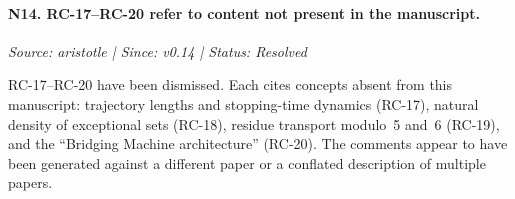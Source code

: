 \documentclass[12pt]{article}
\theoremstyle{definition}
\theoremstyle{remark}
\theoremstyle{plain}
\begin{document}
\paragraph{N14. RC-17--RC-20 refer to content not present in the manuscript.}
\textit{Source: aristotle | Since: v0.14 | Status: Resolved}

RC-17--RC-20 have been dismissed.  Each cites concepts absent from this
manuscript: trajectory lengths and stopping-time dynamics (RC-17), natural
density of exceptional sets (RC-18), residue transport modulo~5 and~6 (RC-19),
and the ``Bridging Machine architecture'' (RC-20).  The comments appear to have
been generated against a different paper or a conflated description of multiple
papers.
\end{document}
